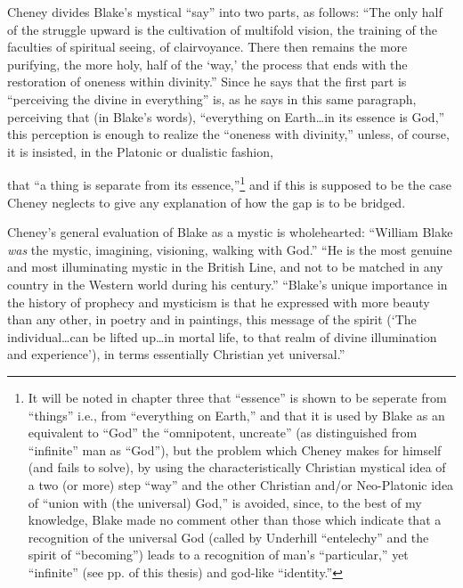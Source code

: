 \label{self:19}

Cheney divides Blake's mystical \enquote{say} into two parts, as follows: \enquote{The only
half of the struggle upward is the cultivation of multifold vision, the training of the faculties
of spiritual seeing, of clairvoyance. There then remains the more purifying, the more holy, half of the
\enquote*{way,} the process that ends with the restoration of oneness within divinity.}\supercite{cheney:walked-with-god}
Since he says that the first part is \enquote{perceiving the divine in everything} is, as he says in this same paragraph, perceiving
that (in Blake's words), \enquote{everything on Earth\dots in its essence is God,} this perception is enough to
realize the \enquote{oneness with divinity,} unless, of course, it is insisted, in the Platonic or dualistic fashion,

\clearpage

\noindent that \enquote{a thing is separate from its essence,}\footnote{It will be noted in chapter three that \enquote{essence} is shown to be seperate from \enquote{things} i.e., from \enquote{everything on Earth,} and that it is used by Blake as an equivalent to \enquote{God} the \enquote{omnipotent, uncreate} (as distinguished from \enquote{infinite} man as \enquote{God}), but the problem which Cheney makes for himself (and fails to solve), by using the characteristically Christian mystical idea of a two (or more) step \enquote{way} and the other Christian and/or Neo-Platonic idea of \enquote{union with (the universal) God,} is avoided, since, to the best of my knowledge, Blake made no comment other than those which indicate that a recognition of the universal God (called by Underhill \enquote{entelechy} and the spirit of \enquote{becoming}) leads to a recognition of man's \enquote{particular,} yet \enquote{infinite} (see pp. \pageref{self:14} of this thesis) and god-like \enquote{identity.}}
and if this is supposed to be the case Cheney neglects to give any explanation of how the gap is to be bridged.

Cheney's general evaluation of Blake as a mystic is wholehearted:\linebreak
\enquote{William Blake \emph{was} the mystic, imagining, visioning,
walking with God.} \enquote{He is the most genuine and most illuminating mystic in the British Line, and not to be
matched in any country in the Western world during his century.}\supercite{cheney:walked-with-god}
\enquote{Blake's unique importance in the history of
prophecy and mysticism is that he expressed with more beauty than any other, in poetry and in paintings, this message of the spirit
(\enquote*{The individual\dots can be lifted up\dots in mortal life, to that realm of divine illumination and experience}), in terms essentially
Christian yet universal.}\supercite{cheney:walked-with-god}


